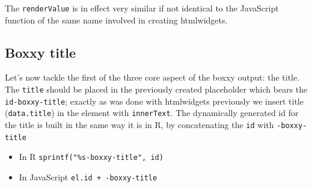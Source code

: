 \documentclass[
]{krantz}
\makeatletter
\newenvironment{Shaded}{\begin{snugshade}}{\end{snugshade}}
\newcommand{\AttributeTok}[1]{\textcolor[rgb]{0.61,0.61,0.61}{#1}}
\newcommand{\CommentTok}[1]{\textcolor[rgb]{0.37,0.37,0.37}{\textit{#1}}}
\newcommand{\ControlFlowTok}[1]{\textcolor[rgb]{0.27,0.27,0.27}{\textbf{#1}}}
\newcommand{\DataTypeTok}[1]{\textcolor[rgb]{0.27,0.27,0.27}{#1}}
\newcommand{\KeywordTok}[1]{\textcolor[rgb]{0.27,0.27,0.27}{\textbf{#1}}}
\newcommand{\NormalTok}[1]{#1}
\newcommand{\OperatorTok}[1]{\textcolor[rgb]{0.43,0.43,0.43}{\textbf{#1}}}
\newcommand{\StringTok}[1]{\textcolor[rgb]{0.5,0.5,0.5}{#1}}
\newcommand{\VariableTok}[1]{\textcolor[rgb]{0,0,0}{#1}}
\providecommand{\tightlist}{%
  \setlength{\itemsep}{0pt}\setlength{\parskip}{0pt}}
\newenvironment{kframe}{%
\medskip{}
\setlength{\fboxsep}{.8em}
 \def\at@end@of@kframe{}%
 \ifinner\ifhmode%
  \def\at@end@of@kframe{\end{minipage}}%
  \begin{minipage}{\columnwidth}%
 \fi\fi%
 \def\FrameCommand##1{\hskip\@totalleftmargin \hskip-\fboxsep
 \colorbox{shadecolor}{##1}\hskip-\fboxsep
     \hskip-\linewidth \hskip-\@totalleftmargin \hskip\columnwidth}%
 \MakeFramed {\advance\hsize-\width
   \@totalleftmargin\z@ \linewidth\hsize
   \@setminipage}}%
 {\par\unskip\endMakeFramed%
 \at@end@of@kframe}
\renewenvironment{Shaded}{\begin{kframe}}{\end{kframe}}
\newenvironment{rmdblock}[1]
  {
  \begin{itemize}
  \renewcommand{\labelitemi}{
    \raisebox{-.7\height}[0pt][0pt]{
      {\setkeys{Gin}{width=3em,keepaspectratio}\texttt{[image: images/\#1]}}
    }
  }
  \setlength{\fboxsep}{1em}
  \begin{kframe}
  \item
  }
  {
  \end{kframe}
  \end{itemize}
  }
\newenvironment{rmdnote}
  {\begin{rmdblock}{note}}
  {\end{rmdblock}}
\makeatother
\begin{document}
\begin{rmdnote}
The \texttt{renderValue} is in effect very similar if not identical to
the JavaScript function of the same name involved in creating
htmlwidgets.
\end{rmdnote}

\hypertarget{boxxy-title}{%
\subsection{Boxxy title}\label{boxxy-title}}

Let's now tackle the first of the three core aspect of the boxxy output: the title. The \texttt{title} should be placed in the previously created placeholder which bears the \texttt{id-boxxy-title}; exactly as was done with htmlwidgets previously we insert title (\texttt{data.title}) in the element with \texttt{innerText}. The dynamically generated id for the title is built in the same way it is in R, by concatenating the \texttt{id} with \texttt{-boxxy-title}

\begin{itemize}
\tightlist
\item
  In R \texttt{sprintf("\%s-boxxy-title",\ id)}
\item
  In JavaScript \texttt{el.id\ +\ \textquotesingle{}-boxxy-title\textquotesingle{}}
\end{itemize}

\begin{Shaded}
\end{Shaded}
\end{document}
